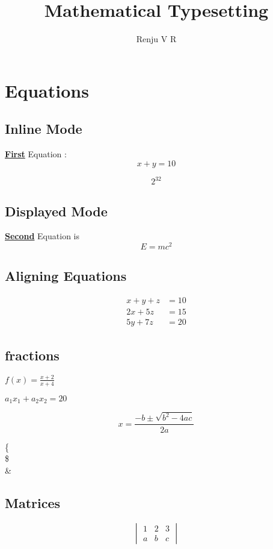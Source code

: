 \documentclass[12pt]{book}
\begin{document}
\title{Mathematical Typesetting}
\author{Renju V R}
\maketitle

\chapter{Equations}

\section{Inline Mode}
\underline{\textbf{First}} Equation  : 
\begin{equation}
 x+y=10   
\end{equation}

\begin{equation} 2^{32} 
\end{equation}

\section{Displayed Mode}

\underline{\textbf{Second}} Equation is
\begin{displaymath}
 E= mc^2 
\end{displaymath}

\section{Aligning Equations}

\begin{align}
x+y+z &= 10 \\
2x+5z &=15	\nonumber \\
5y+7z &= 20	
\end{align}

\section{fractions}

$  f(x)= \displaystyle \frac{x+2}{x+4}	$


$ a_1x_1+a_2x_2 =20 $


$$ x=\frac{-b \pm \sqrt{b^2-4ac}}{2a} $$


\{
\\
\$ \\
\&
\section{Matrices}
$$
\begin{vmatrix}
1 & 2 & 3 \\
a & b & c 
\end{vmatrix}
$$
\end{document}
